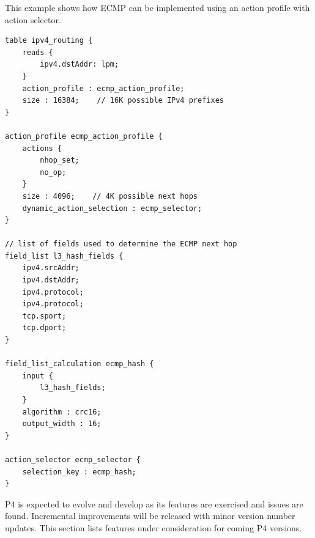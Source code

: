 \documentclass[12pt]{article}
\begin{document}

This example shows how ECMP can be implemented using an action profile with
action selector.

\begin{lstlisting}[keywords={},frame=single,escapechar=\@]
table ipv4_routing {
    reads {
        ipv4.dstAddr: lpm;
    }
    action_profile : ecmp_action_profile;
    size : 16384;    // 16K possible IPv4 prefixes
}

action_profile ecmp_action_profile {
    actions {
        nhop_set;
        no_op;
    }
    size : 4096;    // 4K possible next hops
    dynamic_action_selection : ecmp_selector;
}

// list of fields used to determine the ECMP next hop
field_list l3_hash_fields {
    ipv4.srcAddr;
    ipv4.dstAddr;
    ipv4.protocol;
    ipv4.protocol;
    tcp.sport;
    tcp.dport;
}

field_list_calculation ecmp_hash {
    input {
        l3_hash_fields;
    }
    algorithm : crc16;
    output_width : 16;
}

action_selector ecmp_selector {
    selection_key : ecmp_hash;
}
\end{lstlisting}



P4 is expected to evolve and develop as its features are exercised and issues 
are found. Incremental improvements will be released with minor version number 
updates. This section lists features under consideration for coming P4 versions.
\end{document}
